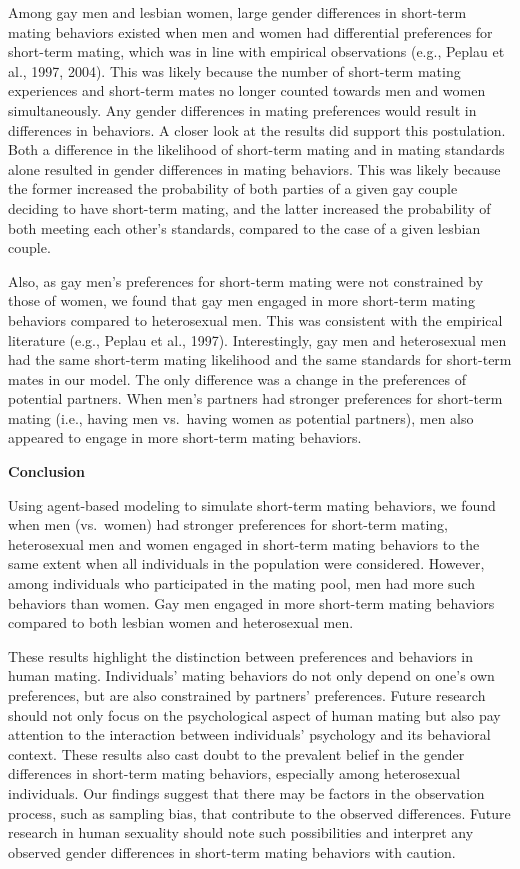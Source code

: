 \documentclass[
  12pt,
]{article}
\begin{document}
Among gay men and lesbian women, large gender differences in short-term
mating behaviors existed when men and women had differential preferences
for short-term mating, which was in line with empirical observations
(e.g., Peplau et al., 1997, 2004). This was likely because the number of
short-term mating experiences and short-term mates no longer counted
towards men and women simultaneously. Any gender differences in mating
preferences would result in differences in behaviors. A closer look at
the results did support this postulation. Both a difference in the
likelihood of short-term mating and in mating standards alone resulted
in gender differences in mating behaviors. This was likely because the
former increased the probability of both parties of a given gay couple
deciding to have short-term mating, and the latter increased the
probability of both meeting each other's standards, compared to the case
of a given lesbian couple.

Also, as gay men's preferences for short-term mating were not
constrained by those of women, we found that gay men engaged in more
short-term mating behaviors compared to heterosexual men. This was
consistent with the empirical literature (e.g., Peplau et al., 1997).
Interestingly, gay men and heterosexual men had the same short-term
mating likelihood and the same standards for short-term mates in our
model. The only difference was a change in the preferences of potential
partners. When men's partners had stronger preferences for short-term
mating (i.e., having men vs.~having women as potential partners), men
also appeared to engage in more short-term mating behaviors.

\vspace{5mm}

\textbf{Conclusion}

Using agent-based modeling to simulate short-term mating behaviors, we
found when men (vs.~women) had stronger preferences for short-term
mating, heterosexual men and women engaged in short-term mating
behaviors to the same extent when all individuals in the population were
considered. However, among individuals who participated in the mating
pool, men had more such behaviors than women. Gay men engaged in more
short-term mating behaviors compared to both lesbian women and
heterosexual men.

These results highlight the distinction between preferences and
behaviors in human mating. Individuals' mating behaviors do not only
depend on one's own preferences, but are also constrained by partners'
preferences. Future research should not only focus on the psychological
aspect of human mating but also pay attention to the interaction between
individuals' psychology and its behavioral context. These results also
cast doubt to the prevalent belief in the gender differences in
short-term mating behaviors, especially among heterosexual individuals.
Our findings suggest that there may be factors in the observation
process, such as sampling bias, that contribute to the observed
differences. Future research in human sexuality should note such
possibilities and interpret any observed gender differences in
short-term mating behaviors with caution.
\end{document}

